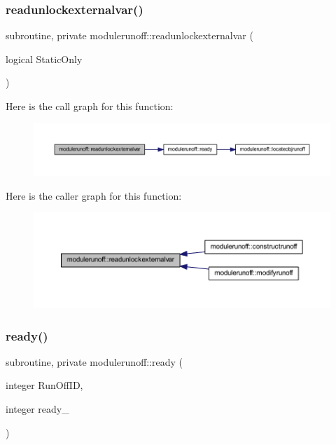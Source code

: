 \subsubsection{\texorpdfstring{readunlockexternalvar()}{readunlockexternalvar()}}
{\footnotesize\ttfamily subroutine, private modulerunoff\+::readunlockexternalvar (\begin{DoxyParamCaption}\item[{logical}]{Static\+Only }\end{DoxyParamCaption})\hspace{0.3cm}{\ttfamily [private]}}

Here is the call graph for this function\+:
\nopagebreak
\begin{figure}[H]
\begin{center}
\leavevmode
\includegraphics[width=350pt]{namespacemodulerunoff_a900316fc0130b378405b9b03d84eb9cd_cgraph}
\end{center}
\end{figure}
Here is the caller graph for this function\+:
\nopagebreak
\begin{figure}[H]
\begin{center}
\leavevmode
\includegraphics[width=350pt]{namespacemodulerunoff_a900316fc0130b378405b9b03d84eb9cd_icgraph}
\end{center}
\end{figure}
\mbox{\label{namespacemodulerunoff_aee0c5b22d517afda2e934847c9da42cb}} 
\subsubsection{\texorpdfstring{ready()}{ready()}}
{\footnotesize\ttfamily subroutine, private modulerunoff\+::ready (\begin{DoxyParamCaption}\item[{integer}]{Run\+Off\+ID,  }\item[{integer}]{ready\+\_\+ }\end{DoxyParamCaption})\hspace{0.3cm}{\ttfamily [private]}}

